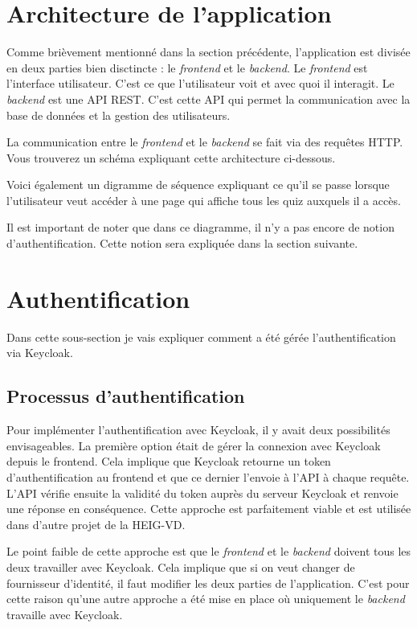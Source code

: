 \section{Architecture de l'application}
Comme brièvement mentionné dans la section précédente, l'application est divisée en deux parties bien disctincte : le \emph{frontend} et le \emph{backend}. Le \emph{frontend} est l'interface utilisateur. C'est ce que l'utilisateur voit et avec quoi il interagit. Le \emph{backend} est une API REST. C'est cette API qui permet la communication avec la base de données et la gestion des utilisateurs.

La communication entre le \emph{frontend} et le \emph{backend} se fait via des requêtes HTTP. Vous trouverez un schéma expliquant cette architecture  ci-dessous.


Voici également un digramme de séquence expliquant ce qu'il se passe lorsque l'utilisateur veut accéder à une page qui affiche tous les quiz auxquels il a accès.


Il est important de noter que dans ce diagramme, il n'y a pas encore de notion d'authentification. Cette notion sera expliquée dans la section suivante.

\section{Authentification}
Dans cette sous-section je vais expliquer comment a été gérée l'authentification via Keycloak.

\subsection{Processus d'authentification}
Pour implémenter l'authentification avec Keycloak, il y avait deux possibilités envisageables. La première option était de gérer la connexion avec Keycloak depuis le frontend. Cela implique que Keycloak retourne un token d'authentification au frontend et que ce dernier l'envoie à l'API à chaque requête. L'API vérifie ensuite la validité du token auprès du serveur Keycloak et renvoie une réponse en conséquence. Cette approche est parfaitement viable et est utilisée dans d'autre projet de la HEIG-VD.

Le point faible de cette approche est que le \emph{frontend} et le \emph{backend} doivent tous les deux travailler avec Keycloak. Cela implique que si on veut changer de fournisseur d'identité, il faut modifier les deux parties de l'application.
C'est pour cette raison qu'une autre approche a été mise en place où uniquement le \emph{backend} travaille avec Keycloak.

